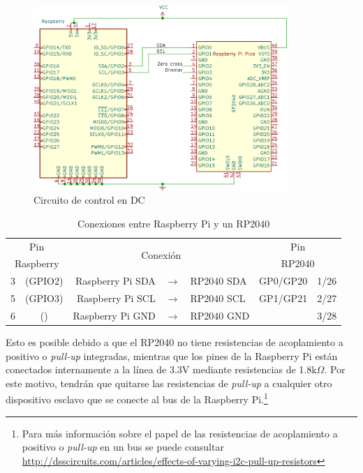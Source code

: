 \begin{figure}[H]
	\centering
	\includegraphics[width=0.5\columnwidth,height=7cm,keepaspectratio]{img/circuit-dc.png}
	\caption{Circuito de control en DC}%
	\label{fig:circuit-dc}
\end{figure}


\begin{table}
	\centering
	\caption{Conexiones \IIC entre Raspberry Pi y un RP2040}
	\label{tbl:pi-pico-i2c} %
	\begin{tabularx}{0.8\linewidth}{cc rcl cc }
	\toprule
	\multicolumn{2}{c}{   Pin   } & \multicolumn{3}{c}{\multirow{2}{*}{Conexión}}     & \multicolumn{2}{c}{  Pin   } \\
	\multicolumn{2}{c}{Raspberry} & \multicolumn{3}{c}{}                              & \multicolumn{2}{c}{ RP2040 } \\
	\midrule
	       3 & (GPIO2)            & Raspberry Pi SDA & \(\rightarrow{}\) & RP2040 SDA & GP0/GP20 & 1/26   \\
	       5 & (GPIO3)            & Raspberry Pi SCL & \(\rightarrow{}\) & RP2040 SCL & GP1/GP21 & 2/27   \\
	       6 & (\GND)             & Raspberry Pi GND & \(\rightarrow{}\) & RP2040 GND &   \GND   & 3/28   \\
	\bottomrule
	\end{tabularx}
\end{table}

Esto es posible debido a que el RP2040 no tiene resistencias de acoplamiento a positivo o \emph{pull-up} integradas, mientras que los pines \IIC de la Raspberry Pi están conectados internamente a la línea de 3.3V mediante resistencias de 1.8k\(\Omega{}\).
Por este motivo, tendrán que quitarse las resistencias de \emph{pull-up} a cualquier otro dispositivo esclavo que se conecte al bus \IIC de la Raspberry Pi.\footnote{Para más información sobre el papel de las resistencias de acoplamiento a positivo o \emph{pull-up} en un bus \IIC se puede consultar \url{http://dsscircuits.com/articles/effects-of-varying-i2c-pull-up-resistors} }


